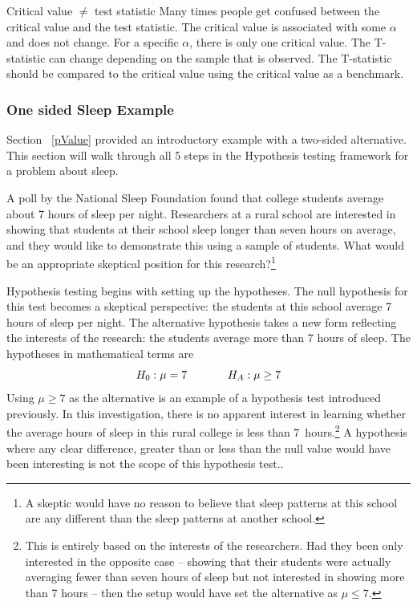 \begin{caution}{Critical value $\neq$ test statistic}
{Many times people get confused between the critical value and the test statistic. The critical value is associated with some $\alpha$ and does not change. For a specific $\alpha$, there is only one critical value. The T-statistic can change depending on the sample that is observed. The T-statistic should be compared to the critical value using the critical value as a benchmark.} 
\end{caution}

\subsubsection{One sided Sleep Example}
\label{onesidedSleepExample}

Section ~\ref{pValue} provided an introductory example with a two-sided alternative. This section will walk through all 5 steps in the Hypothesis testing framework for a problem about sleep.

\begin{exercise} \label{skepticalPerspOfRuralSchoolSleepExercise}
A poll by the National Sleep Foundation found that college students average about 7 hours of sleep per night. Researchers at a rural school are interested in showing that students at their school sleep longer than seven hours on average, and they would like to demonstrate this using a sample of students. What would be an appropriate skeptical position for this research?\footnote{A skeptic would have no reason to believe that sleep patterns at this school are any different than the sleep patterns at another school.}
\end{exercise}


Hypothesis testing begins with setting up the hypotheses. The null hypothesis for this test becomes a skeptical perspective: the students at this school average 7 hours of sleep per night. The alternative hypothesis takes a new form reflecting the interests of the research: the students average more than 7 hours of sleep. The hypotheses in mathematical terms are \[H_0: \mu = 7 \hspace{0.5in} H_A: \mu \geq 7\]
Using $\mu \geq 7$ as the alternative is an example of a  hypothesis test introduced previously. In this investigation, there is no apparent interest in learning whether the average hours of sleep in this rural college is less than 7~hours.\footnote{This is entirely based on the interests of the researchers. Had they been only interested in the opposite case -- showing that their students were actually averaging fewer than seven hours of sleep but not interested in showing more than 7 hours -- then the setup would have set the alternative as $\mu \leq 7$.} A  hypothesis where any clear difference, greater than or less than the null value would have been interesting is not the scope of this hypothesis test..

